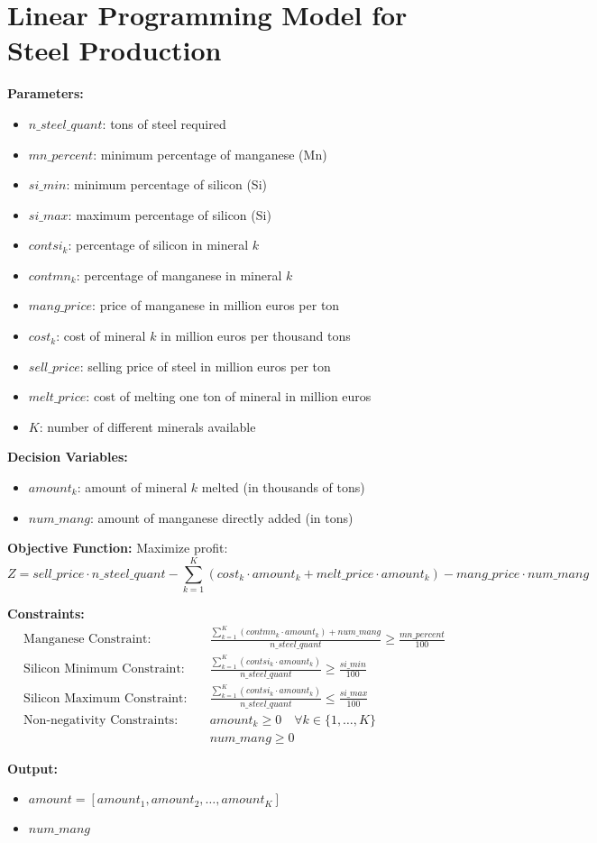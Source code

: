 \documentclass{article}
\begin{document}
\section*{Linear Programming Model for Steel Production}

\textbf{Parameters:}
\begin{itemize}
    \item $n\_steel\_quant$: tons of steel required
    \item $mn\_percent$: minimum percentage of manganese (Mn)
    \item $si\_min$: minimum percentage of silicon (Si)
    \item $si\_max$: maximum percentage of silicon (Si)
    \item $contsi_k$: percentage of silicon in mineral $k$
    \item $contmn_k$: percentage of manganese in mineral $k$
    \item $mang\_price$: price of manganese in million euros per ton
    \item $cost_k$: cost of mineral $k$ in million euros per thousand tons
    \item $sell\_price$: selling price of steel in million euros per ton
    \item $melt\_price$: cost of melting one ton of mineral in million euros
    \item $K$: number of different minerals available
\end{itemize}

\textbf{Decision Variables:}
\begin{itemize}
    \item $amount_k$: amount of mineral $k$ melted (in thousands of tons)
    \item $num\_mang$: amount of manganese directly added (in tons)
\end{itemize}

\textbf{Objective Function:}
Maximize profit:
\[
Z = sell\_price \cdot n\_steel\_quant - \sum_{k=1}^{K} \left( cost_k \cdot amount_k + melt\_price \cdot amount_k \right) - mang\_price \cdot num\_mang
\]

\textbf{Constraints:}
\begin{align}
    \text{Manganese Constraint:} & \quad \frac{\sum_{k=1}^{K} (contmn_k \cdot amount_k) + num\_mang}{n\_steel\_quant} \geq \frac{mn\_percent}{100} \\
    \text{Silicon Minimum Constraint:} & \quad \frac{\sum_{k=1}^{K} (contsi_k \cdot amount_k)}{n\_steel\_quant} \geq \frac{si\_min}{100} \\
    \text{Silicon Maximum Constraint:} & \quad \frac{\sum_{k=1}^{K} (contsi_k \cdot amount_k)}{n\_steel\_quant} \leq \frac{si\_max}{100} \\
    \text{Non-negativity Constraints:} & \quad amount_k \geq 0 \quad \forall k \in \{1, \ldots, K\} \\
    & \quad num\_mang \geq 0 
\end{align}

\textbf{Output:}
\begin{itemize}
    \item $amount = [amount_1, amount_2, \ldots, amount_K]$
    \item $num\_mang$
\end{itemize}
\end{document}
